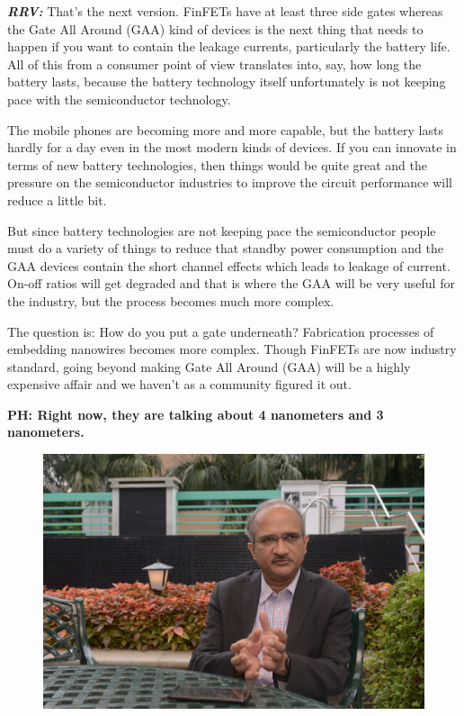 \begin{multicols}{2}
\textbf{\textit{RRV: }} That’s the next version. FinFETs have at least three side gates whereas the Gate All Around (GAA) kind of devices is the next thing that needs to happen if you want to contain the leakage currents, particularly the battery life. All of this from a consumer point of view translates into, say, how long the battery lasts, because the battery technology itself unfortunately is not keeping pace with the semiconductor technology.
 
 The mobile phones are becoming more and more capable, but the battery lasts hardly for a day even in the most modern kinds of devices. If you can innovate in terms of new battery technologies, then things would be quite great and the pressure on the semiconductor industries to improve the circuit performance will reduce a little bit.
 
 But since battery technologies are not keeping pace the semiconductor people must do a variety of things to reduce that standby power consumption and the GAA devices contain the short channel effects which leads to leakage of current. On-off ratios will get degraded and that is where the GAA will be very useful for the industry, but the process becomes much more complex.
 
 The question is: How do you put a gate underneath? Fabrication processes of embedding nanowires becomes more complex. Though FinFETs are now industry standard, going beyond making Gate All Around (GAA) will be a highly expensive affair and we haven’t as a community figured it out.
 
\textbf{PH: Right now, they are talking about 4 nanometers and 3 nanometers.}

\begin{figure}[H]
\centering
\includegraphics[scale=.59]{src/Figures/interview/interview-fig11.jpg}
\vspace{-.5cm}
\end{figure}


\end{multicols}
